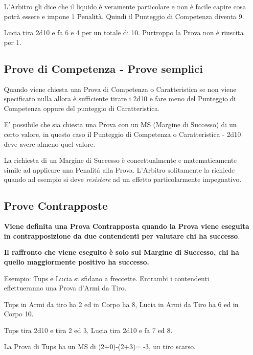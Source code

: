 \documentclass[12pt,a4paper,twoside,openany]{book}
\begin{document}
\begin{multicols}{2}
L'Arbitro gli dice che il liquido è veramente particolare e non è facile capire cosa potrà essere e impone 1 Penalità. Quindi il Punteggio di Competenza diventa 9.

Lucia tira 2d10 e fa 6 e 4 per un totale di 10. Purtroppo la Prova non è riuscita per 1.

\subsection{Prove di Competenza - Prove semplici}

Quando viene chiesta una Prova di Competenza o Caratteristica se non viene specificato nulla allora è sufficiente tirare i 2d10 e fare meno del Punteggio di Competenza oppure del punteggio di Caratteristica.

E' possibile che sia chiesta una Prova con un MS (Margine di Successo) di un certo valore, in questo caso il Punteggio di Competenza o Caratteristica - 2d10 deve avere almeno quel valore. 

\begin{narratore}
La richiesta di un Margine di Successo è concettualmente e matematicamente simile ad applicare una Penalità alla Prova. L'Arbitro solitamente la richiede quando ad esempio si deve \textit{resistere} ad un effetto particolarmente impegnativo.	
\end{narratore}

\subsection{Prove Contrapposte}

\textbf{Viene definita una Prova Contrapposta quando la Prova viene eseguita in contrapposizione da due contendenti per valutare chi ha successo}.

\textbf{Il raffronto che viene eseguito è solo sul Margine di Successo, chi ha quello maggiormente positivo ha successo.}

Esempio: Tups e Lucia si sfidano a freccette.
Entrambi i contendenti effettueranno una Prova d'Armi da Tiro.

Tups in Armi da tiro ha 2 ed in Corpo ha 8, Lucia in Armi da Tiro ha 6 ed in Corpo 10.

Tups tira 2d10 e tira 2 ed 3, Lucia tira 2d10 e fa 7 ed 8.

La Prova di Tups ha un MS di (2+0)-(2+3)= -3, un tiro scarso.


\end{multicols}
\end{document}
